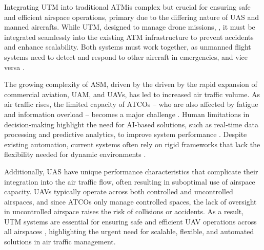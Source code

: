 Integrating \gls{UTM} into traditional \gls{ATM}is complex but crucial for ensuring safe and efficient airspace operations, primary due to the differing nature of \gls{UAS} and manned aircrafts. 
While \gls{UTM}, designed to manage drone missions, , it must be integrated seamlessly into the existing \gls{ATM} infrastructure to prevent accidents and enhance scalability. 
Both systems must work together, as unmanned flight systems need to detect and respond to other aircraft in emergencies, and vice versa \cite{flynex2020utm_atm}.

The growing complexity of \gls{ASM}, driven by the driven by the rapid expansion of commercial aviation, \gls{UAM}, and \glspl{UAV}, has led to increased air traffic volume.
As air traffic rises, the limited capacity of \glspl{ATCO} -- who are also affected by fatigue and information overload -- becomes a major challenge \cite{Ramachandran_2025}.
Human limitations in decision-making highlight the need for AI-based solutions, such as real-time data processing and predictive analytics, to improve system performance \cite{Ramachandran_2025}.
Despite existing automation, current systems often rely on rigid frameworks that lack the flexibility needed for dynamic environments  \cite{Meier_2024}.

Additionally, \gls{UAS} have unique performance characteristics that complicate their integration into the air traffic flow, often resulting in suboptimal use of airspace capacity.
\Glspl{UAV} typically operate across both controlled and uncontrolled airspaces, and since \glspl{ATCO} only manage controlled spaces, the lack of oversight in uncontrolled airspace raises the risk of collisions or accidents. 
As a result, \gls{UTM} systems are essential for ensuring safe and efficient \gls{UAV} operations across all airspaces \cite{Zsolt_2017}, highlighting the urgent need for scalable, flexible, and automated solutions in air traffic management.








